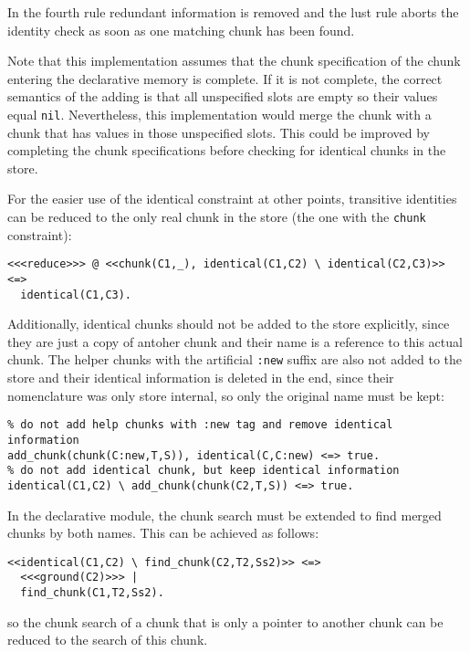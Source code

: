In the fourth rule redundant information is removed and the lust rule aborts the identity check as soon as one matching chunk has been found.

Note that this implementation assumes that the chunk specification of the chunk entering the declarative memory is complete. If it is not complete, the correct semantics of the adding is that all unspecified slots are empty so their values equal \lstinline|nil|. Nevertheless, this implementation would merge the chunk with a chunk that has values in those unspecified slots. This could be improved by completing the chunk specifications before checking for identical chunks in the store.

For the easier use of the identical constraint at other points, transitive identities can be reduced to the only real chunk in the store (the one with the \lstinline|chunk| constraint):

\begin{lstlisting}
<<<reduce>>> @ <<chunk(C1,_), identical(C1,C2) \ identical(C2,C3)>> <=> 
  identical(C1,C3).
\end{lstlisting}

Additionally, identical chunks should not be added to the store explicitly, since they are just a copy of antoher chunk and their name is a reference to this actual chunk. The helper chunks with the artificial \lstinline|:new| suffix are also not added to the store and their identical information is deleted in the end, since their nomenclature was only store internal, so only the original name must be kept:

\begin{lstlisting}
% do not add help chunks with :new tag and remove identical information
add_chunk(chunk(C:new,T,S)), identical(C,C:new) <=> true. 
% do not add identical chunk, but keep identical information
identical(C1,C2) \ add_chunk(chunk(C2,T,S)) <=> true. 
\end{lstlisting}

In the declarative module, the chunk search must be extended to find merged chunks by both names. This can be achieved as follows:

\begin{lstlisting}
<<identical(C1,C2) \ find_chunk(C2,T2,Ss2)>> <=> 
  <<<ground(C2)>>> | 
  find_chunk(C1,T2,Ss2).
\end{lstlisting}

so the chunk search of a chunk that is only a pointer to another chunk can be reduced to the search of this chunk. 

